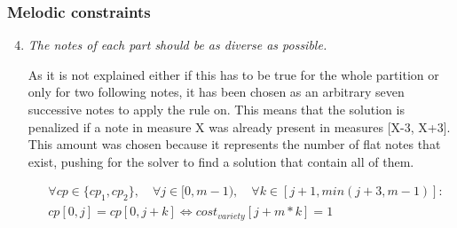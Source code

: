 
\subsubsection{Melodic constraints}
\begin{enumerate}[wide, label=\bfseries 1.M\arabic*]
\setcounter{enumi}{3} %
    \item\label{constraint:variety} \reddot \textit{The notes of each part should be as diverse as possible.}

    As it is not explained either if this has to be true for the whole partition or only for two following notes, it has been chosen as an arbitrary seven successive notes to apply the rule on. This means that the solution is penalized if a note in measure X was already present in measures [X-3, X+3]. This amount was chosen because it represents the number of flat notes that exist, pushing for the solver to find a solution that contain all of them.

    \begin{equation} \begin{aligned}
    &\forall cp \in \{cp_1, cp_2\}, \quad \forall j \in [0, m-1), \quad \forall k \in [j+1, min(j+3, m-1)] :\\ 
    &cp[0, j] = cp[0, j+k]\iff cost_{variety}[j+m*k]= 1
    \end{aligned} \end{equation}
\end{enumerate}

